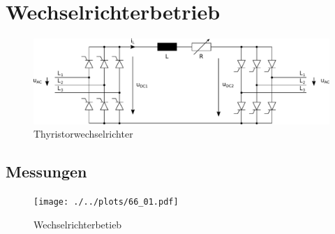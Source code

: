 \section{Wechselrichterbetrieb}

\begin{figure}[h!]
    \centering
    \includegraphics[scale=\sscale]{./../fig/b6_thyristor_wr.pdf}
    \caption{Thyristorwechselrichter}
    \label{fig:b6_thyristor_wr}
\end{figure}

\subsection{Messungen}

\begin{figure}[h!]
    \centering
    \texttt{[image: ./../plots/66\_01.pdf]}
    \caption{Wechselrichterbetieb}
    \label{fig:b2_diode_l16}
\end{figure}

\clearpage
